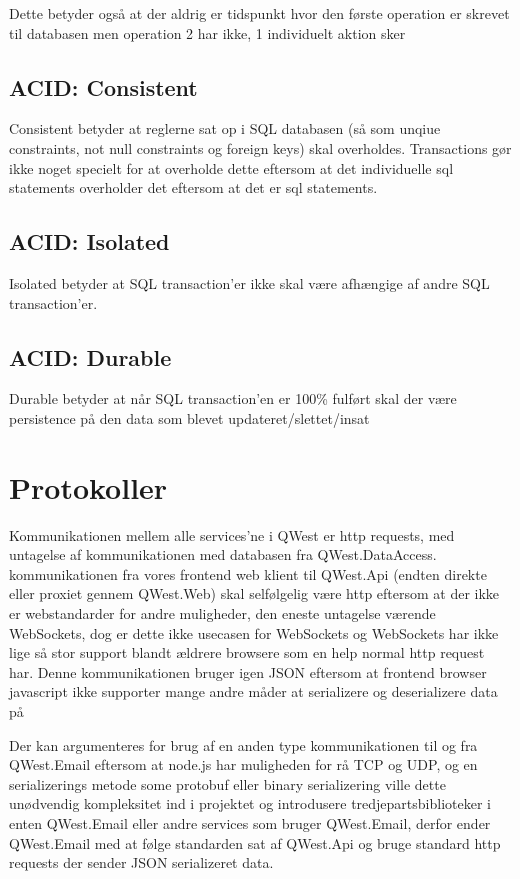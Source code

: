 Dette betyder også at der aldrig er tidspunkt hvor den første operation er skrevet til databasen men operation 2 har ikke, 1 individuelt aktion sker

\subsection{ACID: Consistent}\label{sec:acidConsistent}
Consistent betyder at reglerne sat op i SQL databasen (så som unqiue constraints, not null constraints og foreign keys) skal overholdes. Transactions gør ikke noget specielt for at overholde dette eftersom at det individuelle sql statements overholder det eftersom at det er sql statements.

\subsection{ACID: Isolated}\label{sec:acidIsolated}
Isolated betyder at SQL transaction'er ikke skal være afhængige af andre SQL transaction'er.

\subsection{ACID: Durable}\label{sec:acidDurable}
Durable betyder at når SQL transaction'en er 100\% fulført skal der være persistence på den data som blevet updateret/slettet/insat

\section{Protokoller}\label{sec:protocols}
Kommunikationen mellem alle services'ne i QWest er http requests, med untagelse af kommunikationen med databasen fra QWest.DataAccess. kommunikationen fra vores frontend web klient til QWest.Api (endten direkte eller proxiet gennem QWest.Web) skal selfølgelig være http eftersom at der ikke er webstandarder for andre muligheder, den eneste untagelse værende WebSockets, dog er dette ikke usecasen for WebSockets og WebSockets har ikke lige så stor support blandt ældrere browsere som en help normal http request har. Denne kommunikationen bruger igen JSON eftersom at frontend browser javascript ikke supporter mange andre måder at serializere og deserializere data på

Der kan argumenteres for brug af en anden type kommunikationen til og fra QWest.Email eftersom at node.js har muligheden for rå TCP og UDP, og en serializerings metode some protobuf \cite{ProtoBuf} eller binary serializering \cite{CsharpBinarySerialization} ville dette unødvendig kompleksitet ind i projektet og introdusere tredjepartsbiblioteker i enten QWest.Email eller andre services som bruger QWest.Email, derfor ender QWest.Email med at følge standarden sat af QWest.Api og bruge standard http requests der sender JSON serializeret data.

